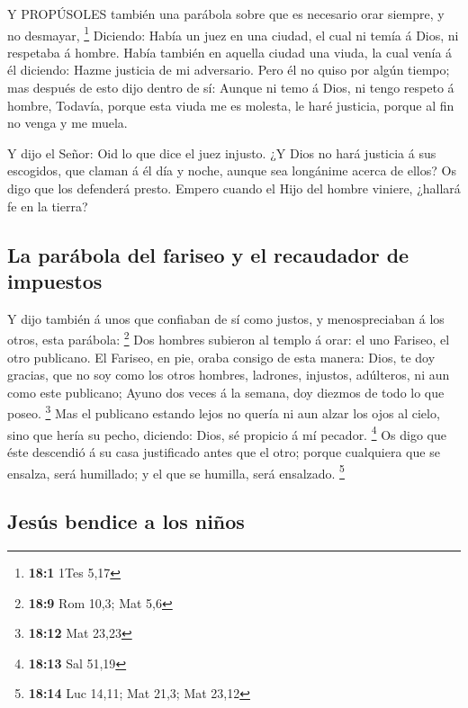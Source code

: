  Y PROPÚSOLES también una parábola sobre que es necesario
orar siempre, y no desmayar, \footnote{\textbf{18:1} 1Tes 5,17}
 Diciendo: Había un juez en una ciudad, el cual ni temía á
Dios, ni respetaba á hombre.  Había también en aquella
ciudad una viuda, la cual venía á él diciendo: Hazme justicia de mi
adversario.  Pero él no quiso por algún tiempo; mas después
de esto dijo dentro de sí: Aunque ni temo á Dios, ni tengo respeto á
hombre,  Todavía, porque esta viuda me es molesta, le haré
justicia, porque al fin no venga y me muela.

 Y dijo el Señor: Oid lo que dice el juez injusto.
 ¿Y Dios no hará justicia á sus escogidos, que claman á él
día y noche, aunque sea longánime acerca de ellos?  Os digo
que los defenderá presto. Empero cuando el Hijo del hombre viniere,
¿hallará fe en la tierra?

\hypertarget{la-paruxe1bola-del-fariseo-y-el-recaudador-de-impuestos}{%
\subsection{La parábola del fariseo y el recaudador de
impuestos}\label{la-paruxe1bola-del-fariseo-y-el-recaudador-de-impuestos}}

 Y dijo también á unos que confiaban de sí como justos, y
menospreciaban á los otros, esta parábola: \footnote{\textbf{18:9} Rom
  10,3; Mat 5,6}  Dos hombres subieron al templo á orar: el
uno Fariseo, el otro publicano.  El Fariseo, en pie, oraba
consigo de esta manera: Dios, te doy gracias, que no soy como los otros
hombres, ladrones, injustos, adúlteros, ni aun como este publicano;
 Ayuno dos veces á la semana, doy diezmos de todo lo que
poseo. \footnote{\textbf{18:12} Mat 23,23}  Mas el
publicano estando lejos no quería ni aun alzar los ojos al cielo, sino
que hería su pecho, diciendo: Dios, sé propicio á mí pecador.
\footnote{\textbf{18:13} Sal 51,19}  Os digo que éste
descendió á su casa justificado antes que el otro; porque cualquiera que
se ensalza, será humillado; y el que se humilla, será ensalzado.
\footnote{\textbf{18:14} Luc 14,11; Mat 21,3; Mat 23,12}

\hypertarget{jesuxfas-bendice-a-los-niuxf1os}{%
\subsection{Jesús bendice a los
niños}\label{jesuxfas-bendice-a-los-niuxf1os}}

